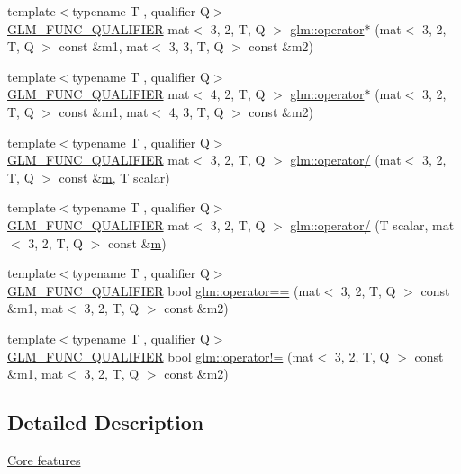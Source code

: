 \begin{DoxyCompactItemize}
\item 
{\footnotesize template$<$typename T , qualifier Q$>$ }\\\hyperlink{setup_8hpp_a33fdea6f91c5f834105f7415e2a64407}{G\+L\+M\+\_\+\+F\+U\+N\+C\+\_\+\+Q\+U\+A\+L\+I\+F\+I\+ER} mat$<$ 3, 2, T, Q $>$ \hyperlink{namespaceglm_abe65c51280e69b884cb8b7dbc4886cea}{glm\+::operator$\ast$} (mat$<$ 3, 2, T, Q $>$ const \&m1, mat$<$ 3, 3, T, Q $>$ const \&m2)
\item 
{\footnotesize template$<$typename T , qualifier Q$>$ }\\\hyperlink{setup_8hpp_a33fdea6f91c5f834105f7415e2a64407}{G\+L\+M\+\_\+\+F\+U\+N\+C\+\_\+\+Q\+U\+A\+L\+I\+F\+I\+ER} mat$<$ 4, 2, T, Q $>$ \hyperlink{namespaceglm_aff7e9be9f5a7f1be34879ba617ea4698}{glm\+::operator$\ast$} (mat$<$ 3, 2, T, Q $>$ const \&m1, mat$<$ 4, 3, T, Q $>$ const \&m2)
\item 
{\footnotesize template$<$typename T , qualifier Q$>$ }\\\hyperlink{setup_8hpp_a33fdea6f91c5f834105f7415e2a64407}{G\+L\+M\+\_\+\+F\+U\+N\+C\+\_\+\+Q\+U\+A\+L\+I\+F\+I\+ER} mat$<$ 3, 2, T, Q $>$ \hyperlink{namespaceglm_af36636be791cabfa4c7c74b5e4c34750}{glm\+::operator/} (mat$<$ 3, 2, T, Q $>$ const \&\hyperlink{_s_d_l__opengl__glext_8h_af593500c283bf1a787a6f947f503a5c2}{m}, T scalar)
\item 
{\footnotesize template$<$typename T , qualifier Q$>$ }\\\hyperlink{setup_8hpp_a33fdea6f91c5f834105f7415e2a64407}{G\+L\+M\+\_\+\+F\+U\+N\+C\+\_\+\+Q\+U\+A\+L\+I\+F\+I\+ER} mat$<$ 3, 2, T, Q $>$ \hyperlink{namespaceglm_afeb27aabe46abc6835401face3676a6e}{glm\+::operator/} (T scalar, mat$<$ 3, 2, T, Q $>$ const \&\hyperlink{_s_d_l__opengl__glext_8h_af593500c283bf1a787a6f947f503a5c2}{m})
\item 
{\footnotesize template$<$typename T , qualifier Q$>$ }\\\hyperlink{setup_8hpp_a33fdea6f91c5f834105f7415e2a64407}{G\+L\+M\+\_\+\+F\+U\+N\+C\+\_\+\+Q\+U\+A\+L\+I\+F\+I\+ER} bool \hyperlink{namespaceglm_a14d8fbb4720478f04b7d69ceab4257a8}{glm\+::operator==} (mat$<$ 3, 2, T, Q $>$ const \&m1, mat$<$ 3, 2, T, Q $>$ const \&m2)
\item 
{\footnotesize template$<$typename T , qualifier Q$>$ }\\\hyperlink{setup_8hpp_a33fdea6f91c5f834105f7415e2a64407}{G\+L\+M\+\_\+\+F\+U\+N\+C\+\_\+\+Q\+U\+A\+L\+I\+F\+I\+ER} bool \hyperlink{namespaceglm_a72389094ef9ca699c284e34a56573b07}{glm\+::operator!=} (mat$<$ 3, 2, T, Q $>$ const \&m1, mat$<$ 3, 2, T, Q $>$ const \&m2)
\end{DoxyCompactItemize}


\subsection{Detailed Description}
\hyperlink{group__core}{Core features} 
